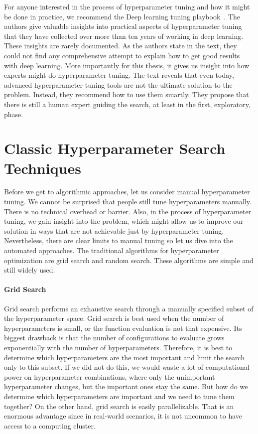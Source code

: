 For anyone interested in the process of hyperparameter tuning and how it might be done in practice, we recommend the Deep learning tuning playbook~\cite{tuningplaybookgithub}. The authors give valuable insights into practical aspects of hyperparameter tuning that they have collected over more than ten years of working in deep learning. These insights are rarely documented. As the authors state in the text, they could not find any comprehensive attempt to explain how to get good results with deep learning. More importantly for this thesis, it gives us insight into how experts might do hyperparameter tuning. The text reveals that even today, advanced hyperparameter tuning tools are not the ultimate solution to the problem. Instead, they recommend how to use them smartly. They propose that there is still a human expert guiding the search, at least in the first, exploratory, phase.



\section{Classic Hyperparameter Search Techniques}
Before we get to algorithmic approaches, let us consider manual hyperparameter tuning. We cannot be surprised that people still tune hyperparameters manually. There is no technical overhead or barrier. Also, in the process of hyperparameter tuning, we gain insight into the problem, which might allow us to improve our solution in ways that are not achievable just by hyperparameter tuning. Nevertheless, there are clear limits to manual tuning so let us dive into the automated approaches. The traditional algorithms for hyperparameter optimization are grid search and random search. These algorithms are simple and still widely used.

\paragraph{Grid Search} Grid search performs an exhaustive search through a manually specified subset of the hyperparameter space. Grid search is best used when the number of hyperparameters is small, or the function evaluation is not that expensive. Its biggest drawback is that the number of configurations to evaluate grows exponentially with the number of hyperparameters. Therefore, it is best to determine which hyperparameters are the most important and limit the search only to this subset. If we did not do this, we would waste a lot of computational power on hyperparameter combinations, where only the unimportant hyperparameter changes, but the important ones stay the same. But how do we determine which hyperparameters are important and we need to tune them together? On the other hand, grid search is easily parallelizable. That is an enormous advantage since in real-world scenarios, it is not uncommon to have access to a computing cluster.

